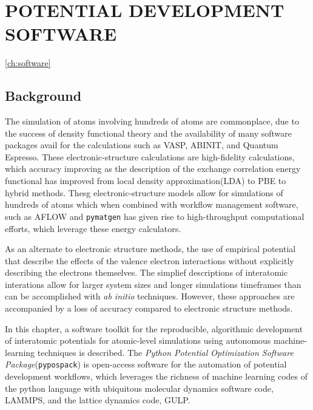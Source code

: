 \chapter{POTENTIAL DEVELOPMENT SOFTWARE}
\ref{ch:software}

\section{Background}
The simulation of atoms involving hundreds of atoms are commonplace, due to the success of density functional theory\cite{hohenberg1964_dft,kohn1965_dft} and the availability of many software packages avail for the calculations such as VASP\cite{kresse1993_vasp,kresse1996_vasp1,kresse1996_vasp2}, ABINIT\cite{gonze2002_abinit,gonze2005_abinit,gonze2009_abinit,gonze2016_abinit}, and Quantum Espresso\cite{giannozzi2009_quantumespresso}.  These electronic-structure calculations are high-fidelity calculations, which accuracy improving as the description of the exchange correlation energy functional has improved from local density approximation(LDA) to PBE to hybrid methods.
Thesg electronic-structure models allow for simulations of hundreds of atoms which when combined with workflow management software, such as AFLOW\cite{curtarolo2012_aflow} and \verb|pymatgen|\cite{ong2013_pymatgen} has given rise to high-throughput computational efforts, which leverage these energy calculators.

As an alternate to electronic structure methods, the use of empirical potential that describe the effects of the valence electron interactions without explicitly describing the electrons themselves.  The simplief descriptions of interatomic interations allow for larger system sizes and longer simulations timeframes than can be accomplished with \emph{ab initio} techniques.  However, these approaches are accompanied by a loss of accuracy compared to electronic structure methods.

In this chapter, a software toolkit for the reproducible, algorithmic development of interatomic potentials for atomic-level simulations using autonomous machine-learning techniques is described.
The \emph{Python Potential Optimization Software Package}(\verb|pypospack|) is open-access software for the automation of potential development workflows, which leverages the richness of machine learning codes of the python language with ubiquitous molecular dynamics software code, LAMMPS\cite{plimpton1995_lammps}, and the lattice dynamics code, GULP\cite{gale2003_gulp}.

